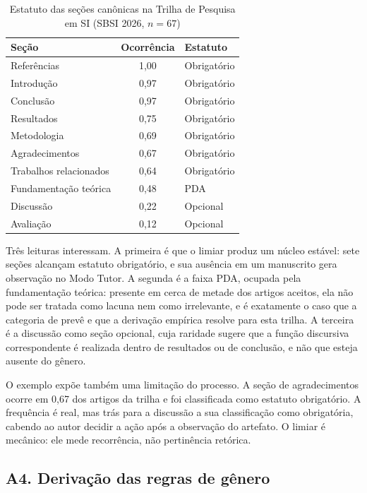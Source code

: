 \begin{table}[H]
\centering
\caption{Estatuto das seções canônicas na Trilha de Pesquisa em SI (SBSI 2026, $n=67$)}
\label{tab:estatutos-exemplo}
\small
\begin{tabular}{|p{5.0cm}|c|p{3.2cm}|}
\hline
\textbf{Seção} & \textbf{Ocorrência} & \textbf{Estatuto} \\
\hline
Referências            & 1,00 & Obrigatório \\
\hline
Introdução             & 0,97 & Obrigatório \\
\hline
Conclusão              & 0,97 & Obrigatório \\
\hline
Resultados             & 0,75 & Obrigatório \\
\hline
Metodologia            & 0,69 & Obrigatório \\
\hline
Agradecimentos         & 0,67 & Obrigatório \\
\hline
Trabalhos relacionados & 0,64 & Obrigatório \\
\hline
Fundamentação teórica  & 0,48 & PDA \\
\hline
Discussão              & 0,22 & Opcional \\
\hline
Avaliação              & 0,12 & Opcional \\
\hline
\end{tabular}
\end{table}

Três leituras interessam. A primeira é que o limiar produz um núcleo estável: sete seções alcançam estatuto obrigatório, e sua ausência em um manuscrito gera observação no Modo Tutor. A segunda é a faixa PDA, ocupada pela fundamentação teórica: presente em cerca de metade dos artigos aceitos, ela não pode ser tratada como lacuna nem como irrelevante, e é exatamente o caso que a categoria de  prevê e que a derivação empírica resolve para esta trilha. A terceira é a discussão como seção opcional, cuja raridade sugere que a função discursiva correspondente é realizada dentro de resultados ou de conclusão, e não que esteja ausente do gênero.

O exemplo expõe também uma limitação do processo. A seção de agradecimentos ocorre em 0,67 dos artigos da trilha e foi classificada como estatuto obrigatório. A frequência é real, mas trás para a discussão a sua classificação como obrigatória, cabendo ao autor decidir a ação após a observação do artefato. O limiar é mecânico: ele mede recorrência, não pertinência retórica. 


\subsection*{A4. Derivação das regras de gênero}

